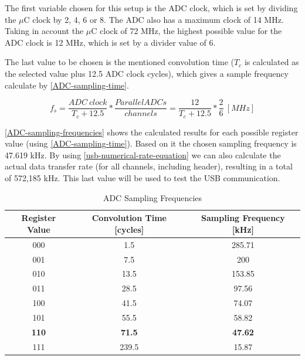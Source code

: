 The first variable chosen for this setup is the ADC clock, which is set by dividing
the $\mu$C clock by 2, 4, 6 or 8. The ADC also has a maximum clock of 14 MHz. Taking in
account the  $\mu$C clock of 72 MHz, the highest possible value for the ADC clock is 12 MHz,
which is set by a divider value of 6. 

The last value to be chosen is the mentioned convolution time ($T_{c}$ is calculated as the selected
value plus 12.5 ADC clock cycles), which gives a sample frequency calculate by \autoref{ADC-sampling-time}.

\begin{equation}
  \label{ADC-sampling-time}
  f_{s} = \frac{ADC\ clock}{T_{c} + 12.5}  * \frac{Parallel ADCs}{channels} = \frac{12}{T_{c} + 12.5}  * \frac{2}{6}\ [MHz]
\end{equation}

\autoref{ADC-sampling-frequencies} shows the calculated results for each possible
register value (using \autoref{ADC-sampling-time}). Based on it the chosen sampling
frequency is 47.619 kHz. By using \autoref{usb-numerical-rate-equation} we can also
calculate the actual data transfer rate (for all channels, including header),
resulting in a total of 572,185 kHz. This last value will be used to test the USB communication.

\begin{table}[htb]
  \caption{ADC Sampling Frequencies}
  \label{ADC-sampling-frequencies}
  \begin{tabular}{c|c|c}
    \textbf{Register Value} & \textbf{Convolution Time [cycles]} & \textbf{Sampling Frequency [kHz]}\\
    \hline \hline
    000 & 1.5 & 285.71 \\
    \hline
    001 & 7.5 & 200 \\
    \hline
    010 & 13.5 & 153.85 \\
    \hline
    011 & 28.5 & 97.56 \\
    \hline
    100 & 41.5 & 74.07 \\
    \hline
    101 & 55.5 & 58.82 \\
    \hline
    \textbf{110} & \textbf{71.5} & \textbf{47.62} \\
    \hline
    111 & 239.5 & 15.87 \\
  \end{tabular}
\end{table}

